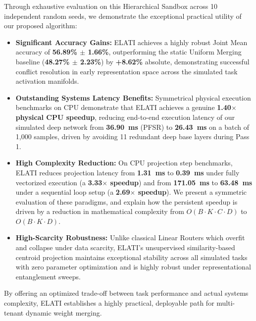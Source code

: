 Through exhaustive evaluation on this Hierarchical Sandbox across 10 independent random seeds, we demonstrate the exceptional practical utility of our proposed algorithm:
\begin{itemize}
    \item \textbf{Significant Accuracy Gains:} ELATI achieves a highly robust Joint Mean accuracy of \textbf{56.89\% $\pm$ 1.66\%}, outperforming the static Uniform Merging baseline (\textbf{48.27\% $\pm$ 2.23\%}) by \textbf{+8.62\%} absolute, demonstrating successful conflict resolution in early representation space across the simulated task activation manifolds.
    \item \textbf{Outstanding Systems Latency Benefits:} Symmetrical physical execution benchmarks on CPU demonstrate that ELATI achieves a genuine \textbf{1.40$\times$ physical CPU speedup}, reducing end-to-end execution latency of our simulated deep network from \textbf{36.90~ms} (PFSR) to \textbf{26.43~ms} on a batch of 1,000 samples, driven by avoiding 11 redundant deep base layers during Pass 1.
    \item \textbf{High Complexity Reduction:} On CPU projection step benchmarks, ELATI reduces projection latency from \textbf{1.31~ms} to \textbf{0.39~ms} under fully vectorized execution (a \textbf{3.33$\times$ speedup}) and from \textbf{171.05~ms} to \textbf{63.48~ms} under a sequential loop setup (a \textbf{2.69$\times$ speedup}). We present a symmetric evaluation of these paradigms, and explain how the persistent speedup is driven by a reduction in mathematical complexity from $O(B \cdot K \cdot C \cdot D)$ to $O(B \cdot K \cdot D)$.
    \item \textbf{High-Scarcity Robustness:} Unlike classical Linear Routers which overfit and collapse under data scarcity, ELATI's unsupervised similarity-based centroid projection maintains exceptional stability across all simulated tasks with zero parameter optimization and is highly robust under representational entanglement sweeps.
\end{itemize}

By offering an optimized trade-off between task performance and actual systems complexity, ELATI establishes a highly practical, deployable path for multi-tenant dynamic weight merging.
